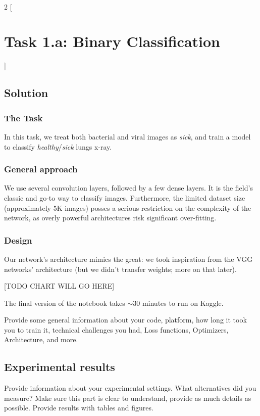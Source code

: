 \documentclass{article}
\begin{document}
\
\begin{multicols}{2}
[
\section{\centering Task 1.a: Binary Classification}
]
\subsection{Solution}
\subsubsection{The Task}
In this task, we treat both bacterial and viral images as
\textit{sick}, and train a model to classify \textit{healthy}/\textit{sick} lungs x-ray.

\subsubsection{General approach}
We use several convolution layers, followed by a few dense layers. It is the field's classic and go-to way to classify images. Furthermore, the limited dataset size (approximately 5K images) posses a serious restriction on the complexity of the network, as overly powerful architectures risk significant over-fitting.

\subsubsection{Design}
Our network's architecture mimics the great: we took inspiration from the VGG networks' architecture (but we didn't transfer weights; more on that later). 

[TODO CHART WILL GO HERE]

The final version of the notebook takes $\sim$30 minutes to run on Kaggle. 

Provide some general information about your code, platform, how long it took you to train it, technical challenges you had, Loss functions, Optimizers, Architecture, and more.

\subsection{Experimental results}
Provide information about your experimental settings. What alternatives did you measure? Make sure this part is clear to understand, provide as much details as possible. Provide results with tables and figures.


\end{multicols}
\end{document}
